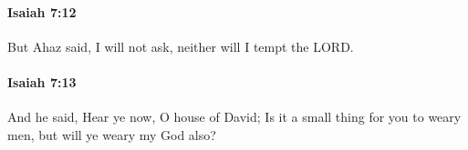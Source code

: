 		\paragraph{Isaiah 7:12} %
			\label{ISAIAH-7-12}

			But Ahaz said, I will not ask, neither will I tempt the LORD.


		\paragraph{Isaiah 7:13} %
			\label{ISAIAH-7-13}

			And he said, Hear ye now, O house of David; Is it a small thing for you to weary men, but will ye weary my God also?


